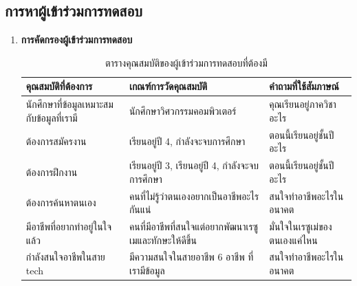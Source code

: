 \subsection{การหาผู้เข้าร่วมการทดสอบ}
\begin{enumerate}
    \item \textbf{การคัดกรองผู้เข้าร่วมการทดสอบ}
          \begin{table}[H]
              \caption{ตารางคุณสมบัติของผู้เข้าร่วมการทดสอบที่ต้องมี}
              \label{tab:my-table}
              \begin{tabularx}{\textwidth}{|X|X|X|}
                  \hline
                  \textbf{คุณสมบัติที่ต้องการ} & \textbf{เกณฑ์การวัดคุณสมบัติ} & \textbf{คำถามที่ใช้สัมภาษณ์} \\ \hline
                  นักศึกษาที่ข้อมูลเหมาะสมกับข้อมูลที่เรามี        & นักศึกษาวิศวกรรมคอมพิวเตอร์                                                     & คุณเรียนอยู่ภาควิชาอะไร                                                                 \\ \hline
                  ต้องการสมัครงาน                        & เรียนอยู่ปี 4, กำลังจะจบการศึกษา                                                  & ตอนนี้เรียนอยู่ชั้นปีอะไร                                                                  \\ \hline
                  ต้องการฝึกงาน                          & เรียนอยู่ปี 3, เรียนอยู่ปี 4, กำลังจะจบการศึกษา                                       & ตอนนี้เรียนอยู่ชั้นปีอะไร                                                                  \\ \hline
                  ต้องการค้นหาตนเอง                      & คนที่ไม่รู้ว่าตนเองอยากเป็นอาชีพอะไรกันแน่                                           & สนใจทำอาชีพอะไรในอนาคต                                                               \\ \hline
                  มีอาชีพที่อยากทำอยู่ในใจแล้ว                 & คนที่มีอาชีพที่สนใจแต่อยากพัฒนาเรซูเมและทักษะให้ดีขึ้น                                   & มั่นใจในเรซูเม่ของตนเองแค่ไหน                                                           \\ \hline
                  กำลังสนใจอาชีพในสาย tech                & มีความสนใจในสายอาชีพ 6 อาชีพ ที่เรามีข้อมูล                                        & สนใจทำอาชีพอะไรในอนาคต                                                               \\ \hline

\end{tabularx}
\end{table}
\end{enumerate}
